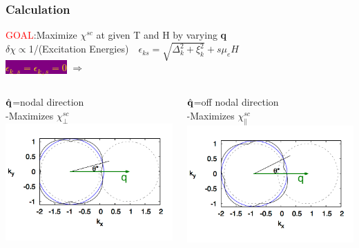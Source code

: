 \documentclass{beamer}
\newcommand\Fontvi{\fontsize{9}{9}\selectfont}
\newcommand\Fontb{\fontsize{20}{20}\selectfont}
\begin{document}
\begin{frame} \frametitle{Calculation}
{\Fontb \textcolor{red}{GOAL}:Maximize $\chi^{sc}$ at given T and H by varying {\bf q}\\
$\delta \chi \propto$1/(Excitation Energies){\Fontvi $\quad \epsilon_{ks}=\sqrt{\Delta_k^2+\xi_k^2}+s\mu_eH$}\\
\colorbox{purple}{\textcolor{yellow}{$\epsilon_{k_-s}=\epsilon_{k_+s}=0$}}
 $\Rightarrow$}

\vspace{0.5cm}
 \begin{columns}
    \begin{column}{0.5\textwidth}
      \centering
      $\hat{\bf q}$=nodal direction \\
 	-Maximizes $\chi^{sc}_{\perp}$ \\
        \includegraphics[scale=0.23]{fermiHotSpotsxx3.jpg}
      \end{column}
    \begin{column}{0.5\textwidth}\centering	
	$\hat{\bf q}$=off nodal direction \\
	-Maximizes $\chi^{sc}_{\parallel}$ \\
      \includegraphics[scale=0.23]{fermiHotSpotszz3.jpg}
	\end{column}
  \end{columns}
\end{frame}
\end{document}
